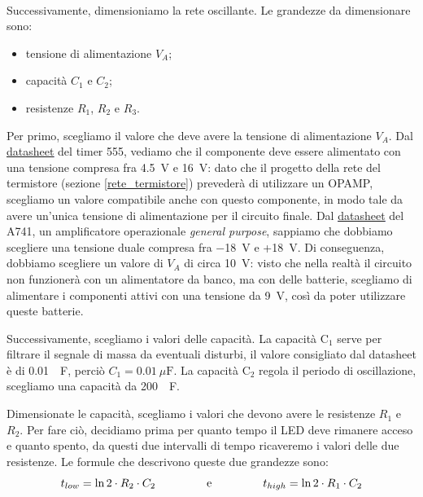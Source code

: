 \documentclass{report}
\begin{document}
\\Successivamente, dimensioniamo la rete oscillante. Le grandezze da dimensionare sono:
\begin{itemize}
\item tensione di alimentazione $V_A$;
\item capacità $C_1$ e $C_2$;
\item resistenze $R_1$, $R_2$ e $R_3$.
\end{itemize}
Per primo, scegliamo il valore che deve avere la tensione di alimentazione $V_A$. Dal \textcolor{blue}{\underline{\href{https://www.ti.com/lit/ds/symlink/lm555.pdf?ts=1667144089940&ref_url=https\%253A\%252F\%252Fwww.ti.com\%252Fproduct\%252FLM555}{datasheet}}} del timer 555, vediamo che il componente deve essere alimentato con una tensione compresa fra \SI{4.5}{\volt} e \SI{16}{\volt}: dato che il progetto della rete del termistore (sezione \ref{rete_termistore}) prevederà di utilizzare un OPAMP, scegliamo un valore compatibile anche con questo componente, in modo tale da avere un'unica tensione di alimentazione per il circuito finale. Dal \textcolor{blue}{\underline{\href{https://www.ti.com/lit/ds/symlink/ua741.pdf?ts=1672216941275&ref_url=https\%253A\%252F\%252Fwww.ti.com\%252Fproduct\%252FUA741}{datasheet}}} del \textmu A741, un amplificatore operazionale \textit{general purpose}, sappiamo che dobbiamo scegliere una tensione duale compresa fra \SI{-18}{\volt} e +\SI{18}{\volt}. Di conseguenza, dobbiamo scegliere un valore di  $V_A$ di circa \SI{10}{\volt}: visto che nella realtà il circuito non funzionerà con un alimentatore da banco, ma con delle batterie, scegliamo di alimentare i componenti attivi con una tensione da \SI{9}{\volt}, così da poter utilizzare queste batterie. \par
Successivamente, scegliamo i valori delle capacità. La capacità $\mathrm{C_1}$ serve per filtrare il segnale di massa da eventuali disturbi, il valore consigliato dal datasheet è di \SI{0.01}{\mu\farad}, perciò $\displaystyle{C_1=\SI{0.01}{\mu\farad}}$. La capacità $\mathrm{C_2}$ regola il periodo di oscillazione, scegliamo una capacità da \SI{200}{\mu\farad}. \par
Dimensionate le capacità, scegliamo i valori che devono avere le resistenze $R_1$ e $R_2$. Per fare ciò, decidiamo prima per quanto tempo il LED deve rimanere acceso e quanto spento, da questi due intervalli di tempo ricaveremo i valori delle due resistenze. Le formule che descrivono queste due grandezze sono:
\\$$t_{low}=\ln2\cdot R_2\cdot C_2\indent\indent\indent \mathrm{e}\indent\indent\indent t_{high}=\ln2\cdot R_1\cdot C_2$$
\end{document}
